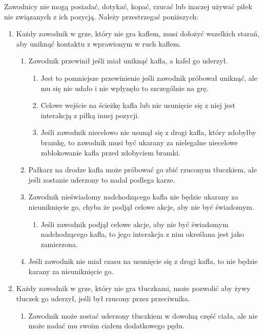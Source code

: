 \documentclass[11pt,a4paper]{article}
\renewcommand{\subsubsection}[1]{
  \oldsubsubsection{#1}%
  \label{\thesubsubsection}
}
\begin{document}
\subsubsection{Interakcje z piłkami innych pozycji}
Zawodnicy nie mogą posiadać, dotykać, kopać, rzucać lub inaczej używać piłek nie związanych z ich pozycją. Należy przestrzegać poniższych:
\begin{enumerate}
  \item Każdy zawodnik w grze, który nie gra kaflem, musi dołożyć wszelkich starań, aby uniknąć kontaktu z wprawionym w ruch kaflem.
  \begin{enumerate}
    \item Zawodnik przewinił jeśli miał uniknąć kafla, a kafel go uderzył.
    \begin{enumerate}
      \item Jest to pomniejsze przewinienie jeśli zawodnik próbował uniknąć, ale mu się nie udało i nie wpłynęło to szczególnie na grę.
      \item Celowe wejście na ścieżkę kafla lub nie usunięcie się z niej jest interakcją z piłką innej pozycji.
      \item Jeśli zawodnik niecelowo nie usunął się z drogi kafla, który zdobyłby bramkę, to zawodnik musi być ukarany za nielegalne niecelowe zablokowanie kafla przed zdobyciem bramki.
    \end{enumerate}
    \item Pałkarz na drodze kafla może próbować go zbić rzuconym tłuczkiem, ale jeśli zostanie uderzony to nadal podlega karze.
    \item Zawodnik nieświadomy nadchodzącego kafla nie będzie ukarany za nieuniknięcie go, chyba że podjął celowe akcje, aby nie być świadomym.
    \begin{enumerate}
      \item Jeśli zawodnik podjął celowe akcje, aby nie być świadomym nadchodzącego kafla, to jego interakcja z nim określana jest jako zamierzona.
    \end{enumerate}
    \item Jeśli zawodnik nie miał czasu na usunięcie się z drogi kafla, to nie będzie karany za nieuniknięcie go.
  \end{enumerate}
  \item Każdy zawodnik w grze, który nie gra tłuczkami, może pozwolić aby żywy tłuczek go uderzył, jeśli był rzucony przez przeciwnika.
  \begin{enumerate}
    \item Zawodnik może zostać uderzony tłuczkiem w dowolną część ciała, ale nie może nadać mu swoim ciałem dodatkowego pędu.

\end{enumerate}
\end{enumerate}
\end{document}
